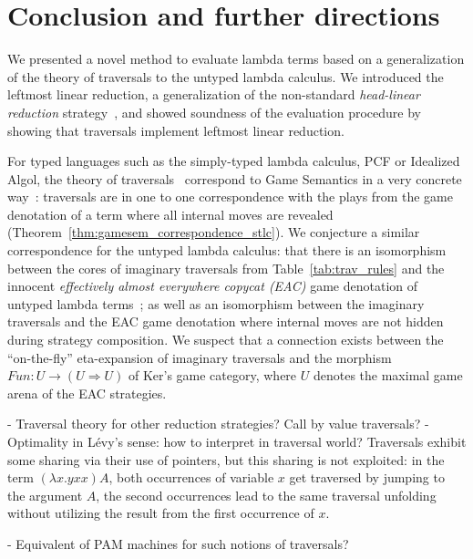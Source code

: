 \documentclass{elsarticle}
\theoremstyle{plain}
\theoremstyle{definition}
\theoremstyle{remark}
\begin{document}
\section{Conclusion and further directions}

We presented a novel method to evaluate lambda terms based on a generalization of the theory of traversals to the untyped lambda calculus. We introduced the leftmost linear reduction, a generalization of the non-standard \emph{head-linear reduction} strategy~\cite{danos-head}, and showed soundness of the evaluation procedure by showing that traversals implement leftmost linear reduction.

For typed languages such as the simply-typed lambda calculus, PCF or Idealized Algol, the theory of traversals~\cite{OngLics2006} correspond to Game Semantics in a very concrete way~\cite{BlumPhd}: traversals are in one to one correspondence with the plays from the game denotation of a term where all internal moves are revealed (Theorem~\ref{thm:gamesem_correspondence_stlc}). We conjecture a similar correspondence for the untyped lambda calculus: that there is an isomorphism between the cores of imaginary traversals from Table~\ref{tab:trav_rules} and the innocent \emph{effectively almost everywhere copycat (EAC)} game denotation of untyped lambda terms~\cite{KerThesis}; as well as an isomorphism between the imaginary traversals and the EAC game denotation where internal moves are not hidden during strategy composition. We suspect that a connection exists between the ``on-the-fly'' eta-expansion of imaginary traversals and the morphism $Fun : U \rightarrow (U \Rightarrow U)$ of Ker's game category, where $U$ denotes the maximal game arena of the EAC strategies.

\begin{todobox}
- Traversal theory for other reduction strategies? Call by value traversals?
- Optimality in L\'evy's sense: how to interpret in traversal world?
Traversals exhibit some sharing via their use of pointers, but this sharing is not exploited: in the term $(\lambda x. y x x) A$, both occurrences of variable $x$ get traversed by jumping to the argument $A$, the second occurrences lead to the same traversal unfolding without utilizing the result from the first occurrence of $x$.

- Equivalent of PAM machines for such notions of traversals?
\end{todobox}

\end{document}
